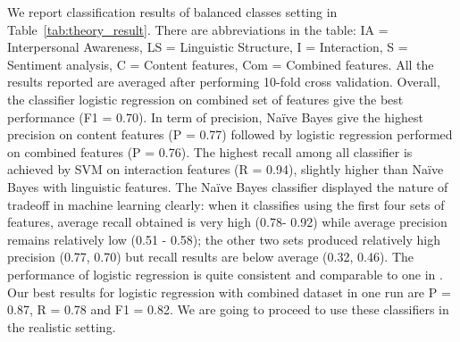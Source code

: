 We report classification results of balanced classes setting in Table~\ref{tab:theory_result}. There are abbreviations in the table: IA = Interpersonal Awareness, LS = Linguistic Structure, I = Interaction, S = Sentiment analysis, C = Content features, Com = Combined features. All the results reported are averaged after performing 10-fold cross validation. Overall, the classifier logistic regression on combined set of features give the best performance (F1 = 0.70). In term of precision, Na\"ive Bayes give the highest precision on content features (P = 0.77) followed by logistic regression performed on combined features (P = 0.76). The highest recall among all classifier is achieved by SVM on interaction features (R = 0.94), slightly higher than Na\"ive Bayes with linguistic features. The Na\"ive Bayes classifier displayed the nature of tradeoff in machine learning clearly: when it classifies using the first four sets of features, average recall obtained is very high (0.78-  0.92) while average precision remains relatively low (0.51 - 0.58); the other two sets produced relatively high precision (0.77, 0.70) but recall results are below average (0.32, 0.46). The performance of logistic regression is quite consistent and comparable to one in \cite{DeChoudhury2016}. Our best results for logistic regression with combined dataset in one run are P = 0.87, R = 0.78 and F1 = 0.82. We are going to proceed to use these classifiers in the realistic setting. 
